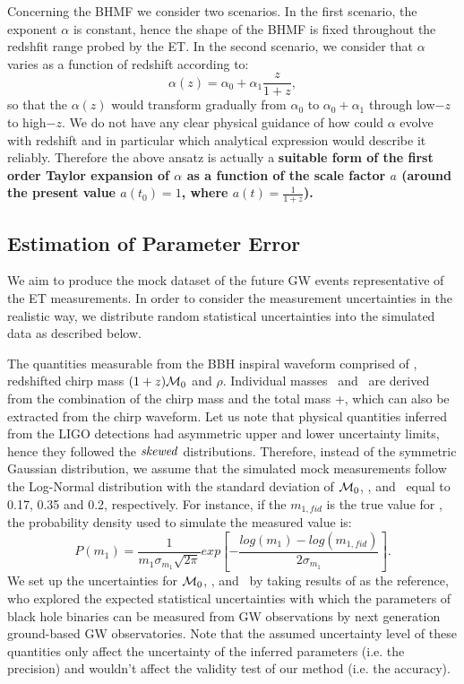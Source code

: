 \documentclass[twocolumn]{aastex62}
\newcommand{\kai}[1]{\textcolor{red}{[{\bf Kai}: #1]}}
\begin{document}
Concerning the BHMF we consider two scenarios. In the first scenario, the exponent $\alpha$ is constant, hence the shape of the BHMF is fixed throughout the redshfit range probed by the ET. In the second scenario, we consider that $\alpha$ varies as a function of redshift according to:
 \begin{equation} \label{equ_alphaz}
\alpha(z) = \alpha_0 + \alpha_1\frac{z}{1+z} , 
 \end{equation}
so that the $\alpha(z)$ would transform gradually from $\alpha_0$ to $\alpha_0+\alpha_1$ through low$-z$ to high$-z$. We do not have any clear physical guidance of how could $\alpha$ evolve  with redshift and in particular which analytical expression would describe it reliably. Therefore the above ansatz is actually a \textbf{ suitable form of the first order Taylor expansion of $\alpha$ as a function of the scale factor $a$ (around the present value $a(t_0)=1$, where $a(t) = \frac{1}{1+z}$).} 

\subsection{Estimation of Parameter Error} \label{sec_noiselevel}
We aim to produce the mock dataset of the future GW events representative of the ET  measurements. In order to consider the measurement uncertainties in the realistic way, we distribute random statistical uncertainties into the simulated data as described below.

The quantities measurable from the BBH inspiral waveform comprised of \dl, redshifted chirp mass $(1+z){\cal M}_0 $ and $\rho$. Individual masses \mone\ and \mtwo\ are derived from the combination of the chirp mass and the total mass \mone+\mtwo, which can also be extracted from the chirp waveform. 
Let us note that physical quantities inferred from the LIGO detections had asymmetric upper and lower uncertainty limits, hence they followed the  ${\it skewed}$  distributions. Therefore, instead of the symmetric Gaussian distribution, we assume that the simulated mock measurements follow the Log-Normal distribution with the standard deviation of  ${\cal M}_0$, \dl, and \mone\ equal to 0.17, 0.35 and 0.2, respectively.
For instance, if the $m_{1,fid}$ is the true value for \mone, the probability density used to simulate the measured value is:
 \begin{equation} \label{equ_lognorm}
P(m_1) = \frac{1}{m_1 \sigma_{m_1} \sqrt{2\pi}} exp \left[- \frac{log(m_1)-log(m_{1,fid})}{2\sigma_{m_1}} \right].
 \end{equation}
We set up the uncertainties for ${\cal M}_0$, \dl, and \mone\ by taking results of \citet{Ghosh2016} as the reference, who explored the expected statistical uncertainties with which the parameters of black hole binaries can be measured from GW observations by next generation ground-based GW observatories. Note that the assumed uncertainty level of these quantities only affect the uncertainty of the inferred parameters (i.e. the precision) and wouldn't affect the validity test of our method (i.e. the  accuracy).
 
\end{document}
